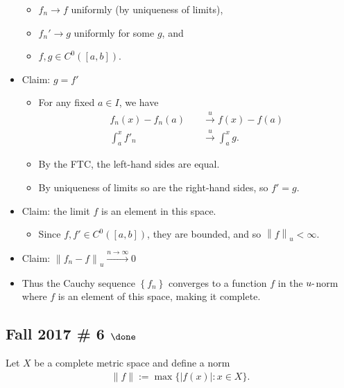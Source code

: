 \begin{solution}
\begin{itemize}
  \begin{itemize}
  \tightlist
  \item
    \(f_n \to f\) uniformly (by uniqueness of limits),
  \item
    \(f_n' \to g\) uniformly for some \(g\), and
  \item
    \(f, g\in C^0([a, b])\).
  \end{itemize}
\item
  Claim: \(g = f'\)

  \begin{itemize}
  \tightlist
  \item
    For any fixed \(a\in I\), we have
    \begin{align*}
    f_n(x) - f_n(a) \quad &\overset{u}\to f(x) - f(a) \\
    \int_a^x f'_n  \quad &\overset{u}\to \int_a^x  g
    .\end{align*}
  \item
    By the FTC, the left-hand sides are equal.
  \item
    By uniqueness of limits so are the right-hand sides, so \(f' = g\).
  \end{itemize}
\item
  Claim: the limit \(f\) is an element in this space.

  \begin{itemize}
  \tightlist
  \item
    Since \(f, f'\in C^0([a, b])\), they are bounded, and so
    \({\left\lVert {f} \right\rVert}_u < \infty\).
  \end{itemize}
\item
  Claim:
  \({\left\lVert {f_n - f} \right\rVert}_u \overset{n\to\infty}\to 0\)
\item
  Thus the Cauchy sequence \(\left\{{f_n}\right\}\) converges to a
  function \(f\) in the \(u{\hbox{-}}\)norm where \(f\) is an element of
  this space, making it complete.
\end{itemize}

\end{solution}

\hypertarget{fall-2017-6-done}{%
\subsection{\texorpdfstring{Fall 2017 \# 6
\(\done\)}{Fall 2017 \# 6 \textbackslash done}}\label{fall-2017-6-done}}

Let \(X\) be a complete metric space and define a norm
\begin{align*}
\|f\|:=\max \{|f(x)|: x \in X\}.
\end{align*}

